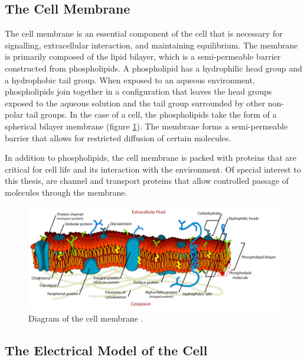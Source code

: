  \subsection{The Cell Membrane}
 \par The cell membrane is an essential component of the cell that is necessary for signalling, extracellular interaction, and maintaining equilibrium. The membrane is primarily composed of the lipid bilayer, which is a semi-permeable barrier constructed from phospholipids. A phospholipid has a hydrophilic head group and a hydrophobic tail group. When exposed to an aqueous environment, phospholipids join together in a configuration that leaves the head groups exposed to the aqueous solution and the tail group surrounded by other non-polar tail groups. In the case of a cell, the phospholipids take the form of a spherical bilayer membrane (figure \ref{fig:cell_membrane}). The membrane forms a semi-permeable barrier that allows for restricted diffusion of certain molecules. 
 
 \par In addition to phospholipids, the cell membrane is packed with proteins that are critical for cell life and its interaction with the environment. Of special interest to this thesis, are channel and transport proteins that allow controlled passage of molecules through the membrane.  
 
 \begin{figure}[h]
    \centering
    \includegraphics[width=\textwidth]{images/Cell_membrane_detailed_diagram.png}
    \caption[Diagram of the cell membrane]{Diagram of the cell membrane \cite{mariana_ruiz_cell_????}.}
    \label{fig:cell_membrane}
 \end{figure}
 
 
\subsection{The Electrical Model of the Cell}

